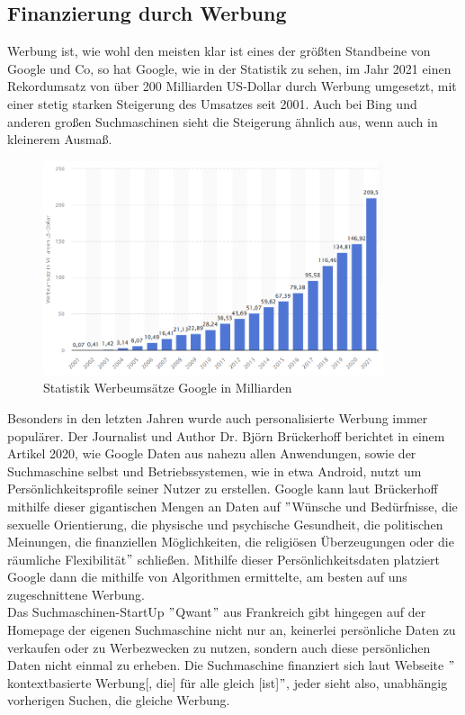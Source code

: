 \subsection{Finanzierung durch Werbung}\label{subsec:finanzierung-durch-werbung}
Werbung ist, wie wohl den meisten klar ist eines der größten Standbeine von Google und Co,
so hat Google, wie in der Statistik zu sehen, im Jahr 2021 einen Rekordumsatz von über 200 Milliarden US-Dollar durch Werbung umgesetzt,
mit einer stetig starken Steigerung des Umsatzes seit 2001.
Auch bei Bing und anderen großen Suchmaschinen sieht die Steigerung ähnlich aus, wenn auch in kleinerem Ausmaß.
\begin{figure}[ht]
    \centering
    \includegraphics[width=100mm]{images/statistic_google_ads}
    \caption{Statistik Werbeumsätze Google in Milliarden}
    \label{fig:statisticAdsGoogle}
\end{figure}
Besonders in den letzten Jahren wurde auch personalisierte Werbung immer populärer.
Der Journalist und Author Dr. Björn Brückerhoff berichtet in einem Artikel 2020,
wie Google Daten aus nahezu allen Anwendungen, sowie der Suchmaschine selbst und Betriebssystemen,
wie in etwa Android, nutzt um Persönlichkeitsprofile seiner Nutzer zu erstellen.
Google kann laut Brückerhoff mithilfe dieser gigantischen Mengen an Daten auf \("\)Wünsche und Bedürfnisse,
die sexuelle Orientierung, die physische und psychische Gesundheit, die politischen Meinungen, die finanziellen Möglichkeiten,
die religiösen Überzeugungen oder die räumliche Flexibilität\("\)\cite{BRK20} schließen.
Mithilfe dieser Persönlichkeitsdaten platziert Google dann die mithilfe von Algorithmen ermittelte,
am besten auf uns zugeschnittene Werbung.\cite{BRK20}\\

Das Suchmaschinen-StartUp \("\)Qwant\("\) aus Frankreich gibt hingegen auf der Homepage der eigenen Suchmaschine nicht nur an,
keinerlei persönliche Daten zu verkaufen oder zu Werbezwecken zu nutzen, sondern auch diese persönlichen Daten nicht einmal zu erheben.
Die Suchmaschine finanziert sich laut Webseite \("\)kontextbasierte Werbung[, die] für alle gleich [ist]\("\)\cite{QWA22},
jeder sieht also, unabhängig vorherigen Suchen, die gleiche Werbung.

